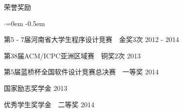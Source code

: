 \documentclass{resume} %
\begin{document}
\begin{rSection}{荣誉奖励}
\begin{list}{$\cdot$}{\leftmargin=0em}
\itemsep -0.5em \vspace{0em}
\item 第5 - 7届河南省大学生程序设计竞赛~~金奖3次 \hfill {2012 - 2014}
\item 第38届ACM/ICPC亚洲区域赛~~铜奖2次 \hfill {2013}
\item 第5届蓝桥杯全国软件设计竞赛总决赛~~一等奖 \hfill{2014}
\item 国家励志奖学金 \hfill {2013}
\item 优秀学生奖学金~~二等奖 \hfill {2014}
\end{list}
\end{rSection}
\end{document}

